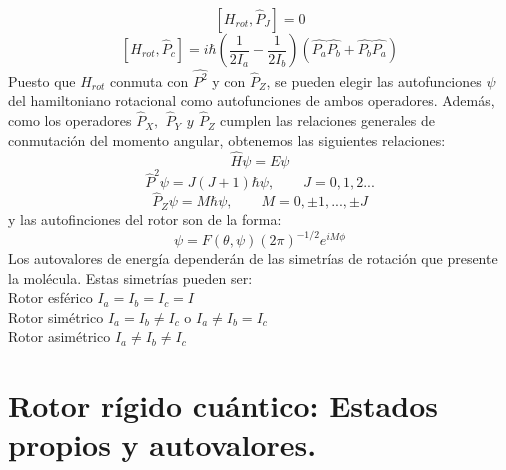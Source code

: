 \documentclass[a4paper]{article}
\begin{document}
\begin{equation}
\left[H_{rot}, \hat P_J \right] = 0
\end{equation}
\begin{equation}
\left[H_{rot}, \hat P_c \right] = i\hbar \left(\frac{1}{2I_a}-\frac{1}{2I_b}\right)\left(\hat{P_a}\hat{P_b}+\hat{P_b}\hat{P_a}\right)
\end{equation}
Puesto que $H_{rot}$ conmuta con $\hat{P^2}$ y con $\hat P_Z$,  se pueden elegir las autofunciones $\psi$ del hamiltoniano rotacional como autofunciones de ambos operadores. Además, como los operadores $\hat P_X, \,\ \hat P_Y \,\ y \,\ \hat P_Z$ cumplen las relaciones generales de conmutación del momento angular, obtenemos las siguientes relaciones:
\begin{equation}
\hat H\psi = E\psi
\end{equation}
\begin{equation}
\hat P^2\psi = J(J+1)\hbar \psi, \qquad J=0,1,2...
\end{equation}
\begin{equation}
\hat P_Z\psi = M\hbar\psi, \qquad M = 0,\pm 1,...,\pm J
\end{equation}
y las autofinciones del rotor son de la forma:
\begin{equation}
\psi = F(\theta, \psi)(2\pi)^{-1/2}e^{iM\phi}
\end{equation}
Los autovalores de energía dependerán de las simetrías de rotación que presente la molécula. Estas simetrías pueden ser:\\
Rotor esférico $I_a=I_b=I_c= I$ \\
Rotor simétrico $I_a=I_b \neq I_c$ o $I_a\neq I_b=I_c$\\
Rotor asimétrico $I_a \neq I_b \neq I_c$\\
\section{Rotor rígido cuántico: Estados propios y autovalores.}
\end{document}
